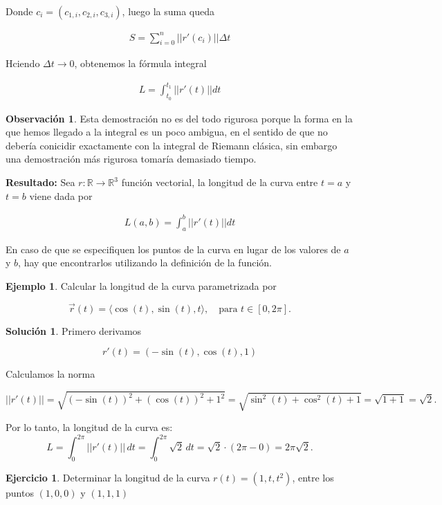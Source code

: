 \documentclass{article}
\theoremstyle{plain}
\theoremstyle{definition}
\newtheorem{ejem}[thm]{Ejemplo}
\newtheorem{ejer}[thm]{Ejercicio}
\newtheorem{sol}[thm]{Solución}
\newtheorem{rmk}[thm]{Observación}
\begin{document}
Donde $c_i = (c_{1,i}, c_{2,i}, c_{3,i}) $, luego la suma queda

\begin{align*}
    S = \sum_{i=0}^n || r'(c_i)||\Delta t
\end{align*}

Hciendo $\Delta t \to 0$, obtenemos la f\'ormula integral

\begin{align*}
    L = \int_{t_0}^{t_1} || r'(t)|| dt
\end{align*}

\begin{rmk}Esta demostraci\'on no es del todo rigurosa porque la forma en la que hemos llegado a la integral es un poco ambigua, en el sentido de que no deber\'ia conicidir exactamente con la integral de Riemann cl\'asica, sin embargo una demostraci\'on m\'as rigurosa tomar\'ia demasiado tiempo. \\
\end{rmk}

\textbf{Resultado:} Sea $r: \mathbb{R} \to \mathbb{R}^3$ función vectorial, la longitud de la curva entre $t=a$ y $t=b$ viene dada por

\begin{align*}
    L(a,b) = \int_a^b ||r'(t)|| dt
\end{align*}

En caso de que se especifiquen los puntos de la curva en lugar de los valores de $a$ y $b$, hay que encontrarlos utilizando la definición de la función. \\


\begin{ejem}Calcular la longitud de la curva parametrizada por
\end{ejem}
\[
\vec{r}(t) = \langle \cos(t), \sin(t), t \rangle, \quad \text{para } t \in [0, 2\pi].
\]

\begin{sol}Primero derivamos
\end{sol}
\[
r'(t) = ( -\sin(t), \cos(t), 1 )
\]

Calculamos la norma

\[
|| r'(t) || = \sqrt{(-\sin(t))^2 + (\cos(t))^2 + 1^2} = \sqrt{\sin^2(t) + \cos^2(t) + 1} = \sqrt{1 + 1} = \sqrt{2}.
\]

Por lo tanto, la longitud de la curva es:
\[
L = \int_0^{2\pi} || r'(t) || \, dt = \int_0^{2\pi} \sqrt{2} \, dt = \sqrt{2} \cdot (2\pi - 0) = 2\pi\sqrt{2}.
\]

\begin{ejer}Determinar la longitud de la curva $r(t) = (1,t,t^2)$, entre los puntos $(1,0,0)$ y $(1,1,1)$ \\
\end{ejer}
\end{document}
